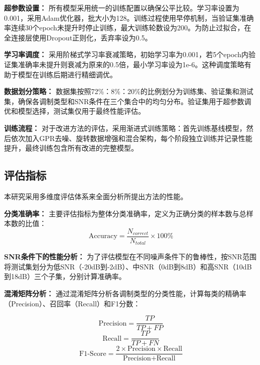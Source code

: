 \documentclass[conference]{IEEEtran}
\begin{document}
\textbf{超参数设置：}
所有模型采用统一的训练配置以确保公平比较。学习率设置为0.001，采用Adam优化器，批大小为128。训练过程使用早停机制，当验证集准确率连续30个epoch未提升时停止训练，最大训练轮数设为200。为防止过拟合，在全连接层使用Dropout正则化，丢弃率设为0.5。

\textbf{学习率调度：}
采用阶梯式学习率衰减策略，初始学习率为0.001，若5个epoch内验证集准确率未提升则衰减为原来的0.5倍，最小学习率设为1e-6。这种调度策略有助于模型在训练后期进行精细调优。

\textbf{数据划分策略：}
数据集按照72\%：8\%：20\%的比例划分为训练集、验证集和测试集，确保各调制类型和SNR条件在三个集合中的均匀分布。验证集用于超参数调优和模型选择，测试集仅用于最终性能评估。

\textbf{训练流程：}
对于改进方法的评估，采用渐进式训练策略：首先训练基线模型，然后依次加入GPR去噪、旋转数据增强和混合架构，每个阶段独立训练并记录性能提升，最终训练包含所有改进的完整模型。

\subsection{评估指标}

本研究采用多维度评估体系来全面分析所提出方法的性能。

\textbf{分类准确率：}
主要评估指标为整体分类准确率，定义为正确分类的样本数与总样本数的比值：
\begin{equation}
\text{Accuracy} = \frac{N_{correct}}{N_{total}} \times 100\%
\end{equation}

\textbf{SNR条件下的性能分析：}
为了评估模型在不同噪声条件下的鲁棒性，按SNR范围将测试集划分为低SNR（-20dB到-2dB）、中SNR（0dB到8dB）和高SNR（10dB到18dB）三个子集，分别计算准确率。

\textbf{混淆矩阵分析：}
通过混淆矩阵分析各调制类型的分类性能，计算每类的精确率（Precision）、召回率（Recall）和F1分数：


\begin{equation}
\text{Precision} = \frac{TP}{TP + FP}
\end{equation}
\begin{equation}
\text{Recall} = \frac{TP}{TP + FN}
\end{equation}
\begin{equation}
\text{F1-Score} = \frac{2 \times \text{Precision} \times \text{Recall}}{\text{Precision} + \text{Recall}}
\end{equation}
\end{document}
